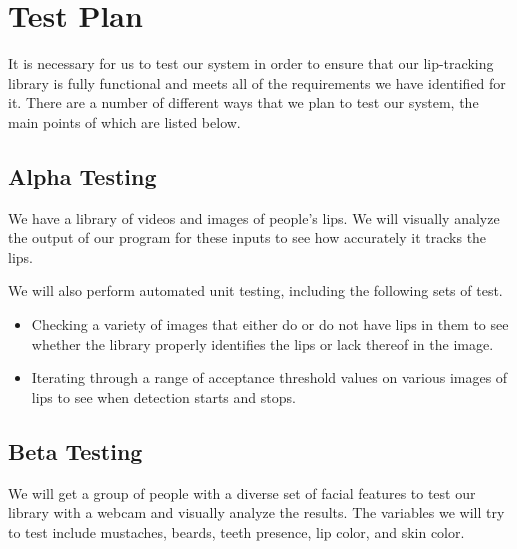 \chapter{Test Plan}

It is necessary for us to test our system in order to ensure that our lip-tracking library is fully functional and meets all of the requirements we have identified for it. There are a number of different ways that we plan to test our system, the main points of which are listed below.

\section{Alpha Testing}

We have a library of videos and images of people's lips. We will visually analyze the output of our program for these inputs to see how accurately it tracks the lips.

We will also perform automated unit testing, including the following sets of test.
\begin{itemize}
	\item Checking a variety of images that either do or do not have lips in them to see whether the library properly identifies the lips or lack thereof in the image.
	\item Iterating through a range of acceptance threshold values on various images of lips to see when detection starts and stops.
\end{itemize}

\section{Beta Testing}

We will get a group of people with a diverse set of facial features to test our library with a webcam and visually analyze the results.
The variables we will try to test include mustaches, beards, teeth presence, lip color, and skin color.